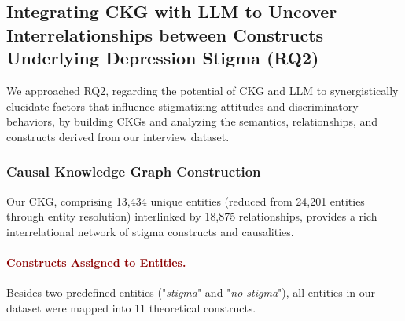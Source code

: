 




\subsection{Integrating CKG with LLM to Uncover Interrelationships between Constructs Underlying Depression Stigma (RQ2)} 

We approached RQ2, regarding the potential of CKG and LLM to synergistically elucidate factors that influence stigmatizing attitudes and discriminatory behaviors, by building CKGs and analyzing the semantics, relationships, and constructs derived from our interview dataset.



\subsubsection{Causal Knowledge Graph Construction}



Our CKG, comprising 13,434 unique entities (reduced from 24,201 entities through entity resolution) interlinked by 18,875 relationships, provides a rich interrelational network of stigma constructs and causalities.




\paragraph{\textcolor{darkred}{\textbf{Constructs Assigned to Entities.}}}


Besides two predefined entities ("\textit{stigma}" and "\textit{no stigma}"), all entities in our dataset were mapped into 11 theoretical constructs.


